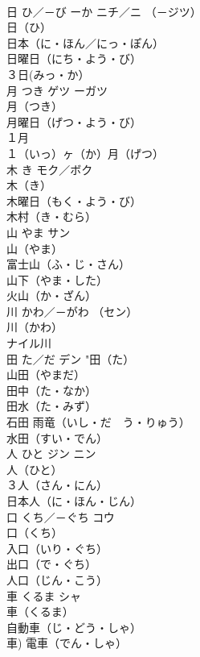 \documentclass[8pt]{extreport}
\begin{document}
\begin{CJK}{UTF8}{min}
\\	日	ひ／－び ーか	ニチ／ニ （－ジツ）	
\\	日（ひ） 
\\	日本（に・ほん／にっ・ぽん） 
\\	日曜日（にち・よう・び） 
\\	３日(みっ・か）　
\\	月	つき	ゲツ ーガツ	
\\	月（つき）　
\\	月曜日（げつ・よう・び）　
\\	１月　
\\	１（いっ）ヶ（か）月（げつ）　
\\	木	き	モク／ボク	
\\	木（き）　
\\	木曜日（もく・よう・び）　
\\	木村（き・むら）　
\\	山	やま	サン	
\\	山（やま）　
\\	富士山（ふ・じ・さん）　
\\	山下（やま・した）　
\\	火山（か・ざん）　
\\	川	かわ／－がわ	（セン）	
\\	川（かわ）　
\\	ナイル川　
\\	田	た／だ	デン		"田（た）　
\\	山田（やまだ）　
\\	田中（た・なか）　
\\	田水（た・みず）　
\\	石田 雨竜（いし・だ　う・りゅう） 
\\	水田（すい・でん）　
\\	人	ひと	ジン ニン	
\\	人（ひと）　
\\	３人（さん・にん）　
\\	日本人（に・ほん・じん）　
\\	口	くち／－ぐち	コウ	
\\	口（くち）　
\\	入口（いり・ぐち）　
\\	出口（で・ぐち）　
\\	人口（じん・こう）　
\\	車	くるま	シャ	
\\	車（くるま）　
\\	自動車（じ・どう・しゃ） 
\\	車) 電車（でん・しゃ） 

\end{CJK}
\end{document}
